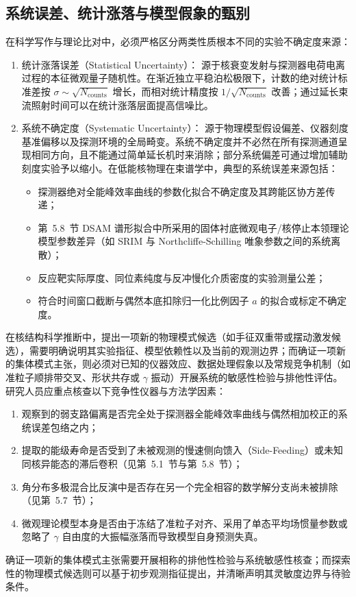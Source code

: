 \subsection{系统误差、统计涨落与模型假象的甄别}\label{subsec:5-10-4}

在科学写作与理论比对中，必须严格区分两类性质根本不同的实验不确定度来源：
\begin{enumerate}
\item 统计涨落误差（Statistical Uncertainty）：
源于核衰变发射与探测器电荷电离过程的本征微观量子随机性。在渐近独立平稳泊松极限下，计数的绝对统计标准差按 $\sigma \sim \sqrt{N_{\mathrm{counts}}}$ 增长，而相对统计精度按 $1/\sqrt{N_{\mathrm{counts}}}$ 改善；通过延长束流照射时间可以在统计涨落层面提高信噪比。
\item 系统不确定度（Systematic Uncertainty）：
源于物理模型假设偏差、仪器刻度基准偏移以及探测环境的全局畸变。系统不确定度并不必然在所有探测通道呈现相同方向，且不能通过简单延长机时来消除；部分系统偏差可通过增加辅助刻度实验予以缩小。在低能核物理在束谱学中，典型的系统误差来源包括：
\begin{itemize}
\item 探测器绝对全能峰效率曲线的参数化拟合不确定度及其跨能区协方差传递；
\item 第~5.8~节 DSAM 谱形拟合中所采用的固体衬底微观电子/核停止本领理论模型参数差异（如 SRIM 与 Northcliffe-Schilling 唯象参数之间的系统离散）；
\item 反应靶实际厚度、同位素纯度与反冲慢化介质密度的实验测量公差；
\item 符合时间窗口截断与偶然本底扣除归一化比例因子 $a$ 的拟合或标定不确定度。
\end{itemize}
\end{enumerate}

在核结构科学推断中，提出一项新的物理模式候选（如手征双重带或摆动激发候选），需要明确说明其实验指征、模型依赖性以及当前的观测边界；而确证一项新的集体模式主张，则必须对已知的仪器效应、数据处理假象以及常规竞争机制（如准粒子顺排带交叉、形状共存或 $\gamma$ 振动）开展系统的敏感性检验与排他性评估。研究人员应重点核查以下竞争性仪器与方法学因素：
\begin{enumerate}
\item 观察到的弱支路偏离是否完全处于探测器全能峰效率曲线与偶然相加校正的系统误差包络之内；
\item 提取的能级寿命是否受到了未被观测的慢速侧向馈入（Side-Feeding）或未知同核异能态的滞后卷积（见第~5.1~节与第~5.8~节）；
\item 角分布多极混合比反演中是否存在另一个完全相容的数学解分支尚未被排除（见第~5.7~节）；
\item 微观理论模型本身是否由于冻结了准粒子对齐、采用了单态平均场惯量参数或忽略了 $\gamma$ 自由度的大振幅涨落而导致模型自身预测失真。
\end{enumerate}
确证一项新的集体模式主张需要开展相称的排他性检验与系统敏感性核查；而探索性的物理模式候选则可以基于初步观测指征提出，并清晰声明其灵敏度边界与待验条件。

